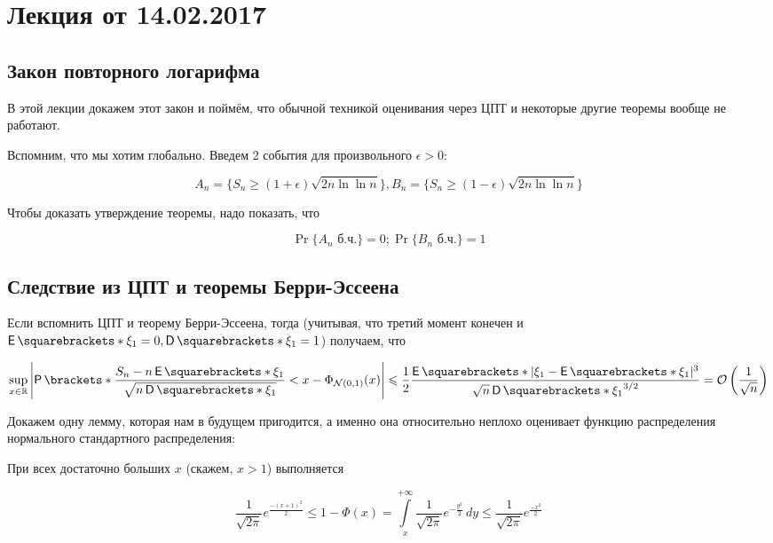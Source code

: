 \section{Лекция от 14.02.2017}

\subsection{Закон повторного логарифма}

В этой лекции докажем этот закон и поймём, что обычной техникой оценивания
через ЦПТ и некоторые другие теоремы вообще не работают.

Вспомним, что мы хотим глобально. Введем 2 события для произвольного $\epsilon > 0$:

\[
  A_n = \{S_n \geq (1 + \epsilon)\sqrt{2n\ln\ln n}\},
  B_n = \{S_n \geq (1 - \epsilon)\sqrt{2n\ln\ln n}\}
\]

Чтобы доказать утверждение теоремы, надо показать, что

\[
  \Pr{\{\text{$A_n$ б.ч.}\}} = 0;
  \Pr{\{\text{$B_n$ б.ч.}\}} = 1
\]

\subsection{Следствие из ЦПТ и теоремы Берри-Эссеена}

Если вспомнить ЦПТ и теорему Берри-Эссеена, тогда (учитывая, что третий момент конечен и
$\E{\xi_1} = 0, \D{\xi_1} = 1$) получаем, что

\[
  \sup\limits_{x \in \R} 
  \left|\Pr{\frac{S_n - n\E{\xi_1}}{\sqrt{n\D{\xi_1}}} < x} - \Phi_{\mathcal{N}(0, 1)}(x)\right|
  \leq \frac12 \frac{\E{|\xi_1 - \E{\xi_1}|^3}}{\sqrt{n}\D{\xi_1}^{3/2}} =
  \mathcal{O}\left(\frac{1}{\sqrt{n}}\right)
\]

Докажем одну лемму, которая нам в будущем пригодится, а именно она относительно
неплохо оценивает функцию распределения нормального стандартного распределения:

\begin{lemma}
  При всех достаточно больших $x$ (скажем, $x > 1$) выполняется

  \[
    \frac{1}{\sqrt{2\pi}}e^{\frac{-(x + 1)^2}{2}} \leq 1 - \Phi(x) = 
    \int\limits_{x}^{+\infty} \frac{1}{\sqrt{2\pi}}e^{-\frac{y^2}{2}}\,dy
    \leq \frac{1}{\sqrt{2\pi}}e^{\frac{-x^2}{2}}
  \]
\end{lemma}

